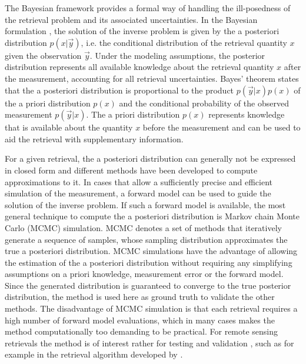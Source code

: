 \documentclass[journal abbreviation, manuscript]{copernicus}
\begin{document}
The Bayesian framework provides a formal way of handling the ill-posedness of
the retrieval problem and its associated uncertainties. In the Bayesian
formulation \citep{rodgers}, the solution of the inverse problem is given by the
a posteriori distribution $p(x | \vec{y})$, i.e. the conditional distribution of
the retrieval quantity $x$ given the observation $\vec{y}$. Under the modeling
assumptions, the posterior distribution represents all available knowledge about
the retrieval quantity $x$ after the measurement, accounting for all retrieval
uncertainties. Bayes' theorem states that the a posteriori distribution is
proportional to the product $p(\vec{y} | x)p(x)$ of the a priori distribution
$p(x)$ and the conditional probability of the observed measurement $p(\vec{y} |
x)$. The a priori distribution $p(x)$ represents knowledge that is available
about the quantity $x$ before the measurement and can be used to aid the
retrieval with supplementary information.

For a given retrieval, the a posteriori distribution can generally not be
expressed in closed form and different methods have been developed to compute
approximations to it. In cases that allow a sufficiently precise and efficient
simulation of the measurement, a forward model can be used to guide the solution
of the inverse problem. If such a forward model is available, the most general
technique to compute the a posteriori distribution is Markov chain Monte Carlo
(MCMC) simulation. MCMC denotes a set of methods that iteratively generate a
sequence of samples, whose sampling distribution approximates the true a
posteriori distribution. MCMC simulations have the advantage of allowing the
estimation of the a posteriori distribution without requiring any simplifying
assumptions on a priori knowledge, measurement error or the forward model. Since
the generated distribution is guaranteed to converge to the true posterior
distribution, the method is used here as ground truth to validate the other
methods. The disadvantage of MCMC simulation is that each retrieval requires a
high number of forward model evaluations, which in many cases makes the method
computationally too demanding to be practical. For remote sensing retrievals the
method is of interest rather for testing and validation \citep{tamminen}, such
as for example in the retrieval algorithm developed by \cite{evans_2}.
\end{document}
